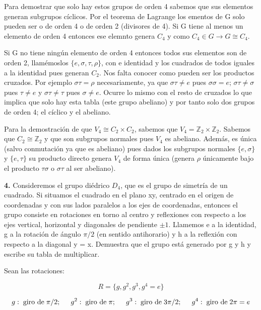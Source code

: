 \smallskip
Para demostrar que solo hay estos grupos de orden 4 sabemos que sus elementos generan subgrupos cíclicos. Por el teorema de Lagrange los ementos de G solo pueden ser o de orden 4 o de orden 2 (divisores de 4). Si G tiene al menos un elemento de orden 4 entonces ese elemnto genera $C_4$ y como $C_4 \in G \to G \cong C_4$.

Si G no tiene ningún elemento de orden 4 entonces todos sus elementos son de orden 2, llamémoslos $\lbrace e,\sigma ,\tau ,\rho \rbrace$, con e identidad y los cuadrados de todos iguales a la identidad pues generan $C_2$. Nos falta conocer como pueden ser los productos cruzados. Por ejemplo $\sigma \tau =\rho$ necesariamente, ya que $\sigma \tau \neq e$ pues $\sigma \sigma =e$; $\sigma \tau \neq \sigma$ pues $\tau \neq e$ y $\sigma \tau \neq \tau$ pues $\sigma \neq e$. Ocurre lo mismo con el resto de cruzados lo que implica que solo hay esta tabla (este grupo abeliano) y por tanto solo dos grupos de orden 4; el cíclico y el abeliano.

\smallskip
Para la demostración de que $V_4\cong C_2 \times C_2$, sabemos que $V_4=\mathds{Z}_2 \times \mathds{Z}_2$. Sabemos que $C_2\cong \mathds{Z}_2$ y que son subgrupos normales pues $V_4$ es abeliano. Además, es única (salvo conmutación ya que es abeliano) pues dados los subgrupos normales $\lbrace e, \sigma \rbrace$ y $\lbrace e, \tau \rbrace$ su producto directo genera $V_4$ de forma única (genera $\rho$ únicamente bajo el producto $\tau \sigma$ o $\sigma \tau$ al ser abeliano).

\bigskip
\textbf{4.} Consideremos el grupo diédrico $D_4$, que es el grupo de simetría de un cuadrado. Si situamos el cuadrado en el
plano xy, centrado en el origen de coordenadas y con sus lados paralelos a los ejes de coordenadas, entonces el
grupo consiste en rotaciones en torno al centro y reflexiones con respecto a los ejes vertical, horizontal y diagonales
de pendiente $\pm 1$. Llamemos e a la identidad, g a la rotación de ángulo $\pi/2$ (en sentido antihorario) y h a la reflexión
con respecto a la diagonal y = x. Demuestra que el grupo está generado por g y h y escribe su tabla de multiplicar.

\smallskip

Sean las rotaciones:

$$R=\lbrace  g,g^2,g^3,g^4=e\rbrace$$

$$g: \hspace{0.1cm} \text{giro de} \hspace{0.1cm} \pi/2; \hspace{0.5cm} g^2: \hspace{0.1cm} \text{giro de} \hspace{0.1cm} \pi; \hspace{0.5cm} g^3: \hspace{0.1cm} \text{giro de} \hspace{0.1cm} 3\pi /2; \hspace{0.5cm} g^4 :  \hspace{0.1cm} \text{giro de} \hspace{0.1cm} 2\pi=e$$

